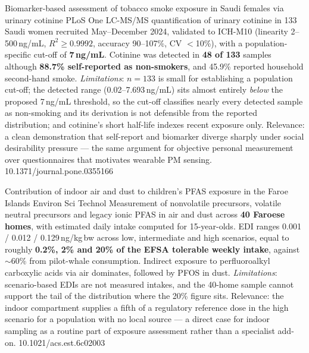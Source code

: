 \documentclass[10pt]{article}
\begin{document}

{Biomarker-based assessment of tobacco smoke exposure in Saudi females via urinary
cotinine}
{PLoS One}
{LC-MS/MS quantification of urinary cotinine in 133 Saudi women recruited May--December
2024, validated to ICH-M10 (linearity 2--500\,ng/mL, $R^2\geq0.9992$, accuracy
90--107\%, CV $<$10\%), with a population-specific cut-off of \textbf{7\,ng/mL}. Cotinine
was detected in \textbf{48 of 133} samples although \textbf{88.7\% self-reported as
non-smokers}, and 45.9\% reported household second-hand smoke. \emph{Limitations}: $n=133$
is small for establishing a population cut-off; the detected range (0.02--7.693\,ng/mL)
sits almost entirely \emph{below} the proposed 7\,ng/mL threshold, so the cut-off
classifies nearly every detected sample as non-smoking and its derivation is not
defensible from the reported distribution; and cotinine's short half-life indexes recent
exposure only. Relevance: a clean demonstration that self-report and biomarker diverge
sharply under social desirability pressure --- the same argument for objective personal
measurement over questionnaires that motivates wearable PM sensing.}
{10.1371/journal.pone.0355166}

{Contribution of indoor air and dust to children's PFAS exposure in the Faroe Islands}
{Environ Sci Technol}
{Measurement of nonvolatile precursors, volatile neutral precursors and legacy ionic
PFAS in air and dust across \textbf{40 Faroese homes}, with estimated daily intake
computed for 15-year-olds. EDI ranges 0.001 / 0.012 / 0.129\,ng/kg\,bw across low,
intermediate and high scenarios, equal to roughly \textbf{0.2\%, 2\% and 20\% of the EFSA
tolerable weekly intake}, against $\sim$60\% from pilot-whale consumption. Indirect
exposure to perfluoroalkyl carboxylic acids via air dominates, followed by PFOS in dust.
\emph{Limitations}: scenario-based EDIs are not measured intakes, and the 40-home sample
cannot support the tail of the distribution where the 20\% figure sits. Relevance: the
indoor compartment supplies a fifth of a regulatory reference dose in the high scenario
for a population with no local source --- a direct case for indoor sampling as a routine
part of exposure assessment rather than a specialist add-on.}
{10.1021/acs.est.6c02003}
\end{document}
